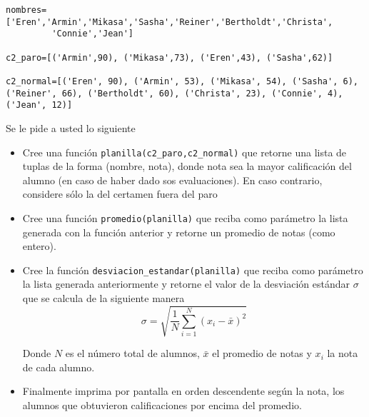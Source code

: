 \documentclass[spanish, fleqn]{scrartcl}
\begin{document}
\begin{lstlisting}[style=consola]
nombres=['Eren','Armin','Mikasa','Sasha','Reiner','Bertholdt','Christa',
         'Connie','Jean']

c2_paro=[('Armin',90), ('Mikasa',73), ('Eren',43), ('Sasha',62)]

c2_normal=[('Eren', 90), ('Armin', 53), ('Mikasa', 54), ('Sasha', 6), 
('Reiner', 66), ('Bertholdt', 60), ('Christa', 23), ('Connie', 4), ('Jean', 12)]
\end{lstlisting}

Se le pide a usted lo siguiente
\begin{itemize}
	\item Cree una función \texttt{planilla(c2\_paro,c2\_normal)} que retorne una lista de tuplas de la forma (nombre, nota), donde nota sea la mayor calificación del alumno (en caso de haber dado sos evaluaciones). En caso contrario, considere sólo la del certamen fuera del paro
	\item Cree una función \texttt{promedio(planilla)} que reciba como parámetro la lista generada con la función anterior y retorne un promedio de notas (como entero).
	\item Cree la función \texttt{desviacion\_estandar(planilla)} que reciba como parámetro la lista generada anteriormente y retorne el valor de la desviación estándar $\sigma$ que se calcula de la siguiente manera
\begin{equation}
\sigma=\sqrt{\frac{1}{N}\sum_{i=1}^N \left( x_i - \bar{x} \right)^2}
\end{equation}

Donde $N$ es el número total de alumnos, $\bar{x}$ el promedio de notas y $x_i$ la nota de cada alumno.

\item Finalmente imprima por pantalla en orden descendente según la nota, los alumnos que obtuvieron calificaciones por encima del promedio.
\end{itemize}
\end{document}
